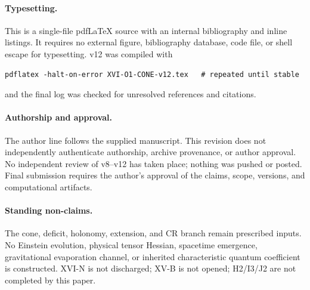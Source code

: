 \documentclass[11pt,a4paper]{article}
\theoremstyle{plain}
\theoremstyle{definition}
\theoremstyle{remark}
\numberwithin{equation}{section}
\begin{document}
\paragraph{Typesetting.}
This is a single-file pdfLaTeX source with an internal
bibliography and inline listings. It requires no external figure,
bibliography database, code file, or shell escape for typesetting.
v12 was compiled with
\begin{verbatim}
pdflatex -halt-on-error XVI-O1-CONE-v12.tex   # repeated until stable
\end{verbatim}
and the final log was checked for unresolved references and
citations.

\paragraph{Authorship and approval.}
The author line follows the supplied manuscript.
This revision does not independently authenticate authorship,
archive provenance, or author approval.
No independent review of v8--v12 has taken place; nothing was pushed
or posted. Final submission requires the author's approval of the claims,
scope, versions, and computational artifacts.

\paragraph{Standing non-claims.}
The cone, deficit, holonomy, extension, and CR branch remain
prescribed inputs. No Einstein evolution, physical tensor
Hessian, spacetime emergence, gravitational evaporation channel,
or inherited characteristic quantum coefficient is constructed.
XVI-N is not discharged; XV-B is not opened; H2/I3/J2 are not
completed by this paper.
\end{document}
